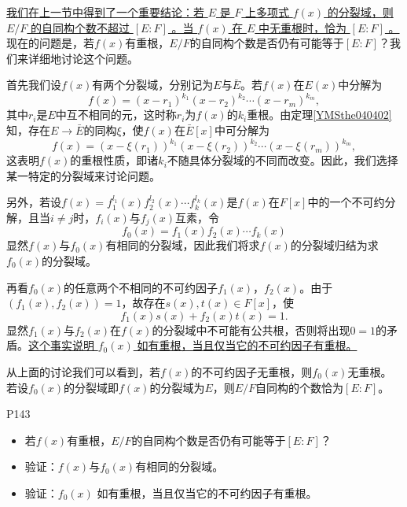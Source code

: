 \original
{
	\uline{我们在上一节中得到了一个重要结论：若 $E$ 是 $F$ 上多项式 $f(x)$ 的分裂域，则 $E/F$ 的自同构个数不超过 $[E:F]$ 。当 $f(x)$ 在 $E$ 中无重根时，恰为 $[E:F]$ 。}现在的问题是，若$f(x)$有重根，$E/F$的自同构个数是否仍有可能等于$[E:F]$？我们来详细地讨论这个问题。
	\par
	首先我们设$f(x)$有两个分裂域，分别记为$E$与$\bar{E}$。若$f(x)$在$E(x)$中分解为
	\begin{equation*}
		f(x)=(x-r_{1})^{k_{1}}(x-r_{2})^{k_{2}}\cdots(x-r_{m})^{k_{m}},
	\end{equation*}
	其中$r_{i}$是$E$中互不相同的元，这时称$r_{i}$为$f(x)$的$k_{i}$重根。由定理\ref{YMSthe040402}知，存在$E \rightarrow \bar{E}$的同构$\xi$，使$f(x)$在$\bar{E}[x]$中可分解为
	\begin{equation*}
		f(x)=(x-\xi(r_{1}))^{k_{1}}(x-\xi(r_{2}))^{k_{2}}\cdots(x-\xi(r_{m}))^{k_{m}},
	\end{equation*}
	这表明$f(x)$的重根性质，即诸$k_{i}$不随具体分裂域的不同而改变。因此，我们选择某一特定的分裂域来讨论问题。
	\par
	另外，若设$f(x)=f_{1}^{l_{1}}(x)f_{2}^{l_{2}}(x)\cdots f_{k}^{l_{k}}(x)$是$f(x)$在$F[x]$中的一个不可约分解，且当$i\neq j$时，$f_{i}(x)$与$f_{j}(x)$互素，令
	\begin{equation*}
		f_{0}(x)=f_{1}(x)f_{2}(x)\cdots f_{k}(x)
	\end{equation*}
	显然$f(x)$与$f_{0}(x)$有相同的分裂域，因此我们将求$f(x)$的分裂域归结为求$f_{0}(x)$的分裂域。
	\par
	再看$f_{0}(x)$的任意两个不相同的不可约因子$f_{1}(x)$，$f_{2}(x)$。由于$(f_{1}(x),f_{2}(x))=1$，故存在$s(x),t(x)\in F[x]$，使
	\begin{equation*}
		f_{1}(x)s(x)+f_{2}(x)t(x)=1.
	\end{equation*}
	显然$f_{1}(x)$与$f_{2}(x)$在$f(x)$的分裂域中不可能有公共根，否则将出现$0=1$的矛盾。\uline{这个事实说明 $f_{0}(x)$ 如有重根，当且仅当它的不可约因子有重根。}
	\par
	从上面的讨论我们可以看到，若$f(x)$的不可约因子无重根，则$f_{0}(x)$无重根。若设$f_{0}(x)$的分裂域即$f(x)$的分裂域为$E$，则$E/F$自同构的个数恰为$[E:F]$。
}
{P143}




\begin{proposition}
	\begin{itemize}
		\item 若$f(x)$有重根，$E/F$的自同构个数是否仍有可能等于$[E:F]$？
		\item 验证：$f(x)$与$f_{0}(x)$有相同的分裂域。
		\item 验证：$f_{0}(x)$ 如有重根，当且仅当它的不可约因子有重根。
	\end{itemize}
\end{proposition}

